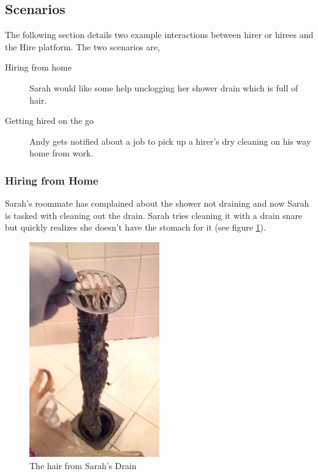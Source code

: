 \documentclass[11pt]{article}
\begin{document}
\subsection{Scenarios}

The following section details two example interactions between hirer or hirees and the Hire platform. The two scenarios are,

\begin{description}
    \item[Hiring from home] Sarah would like some help unclogging her shower drain which is full of hair.
    \item[Getting hired on the go] Andy gets notified about a job to pick up a hirer's dry cleaning on his way home from work.
\end{description}

\subsubsection{Hiring from Home}

Sarah's roommate has complained about the shower not draining and now Sarah is tasked with cleaning out the drain. Sarah tries cleaning it with a drain snare but quickly realizes she doesn't have the stomach for it (see figure \ref{fig:sarahs-drain}).

\begin{figure}[htb]
    \centering
    \includegraphics[width=0.5\textwidth]{Img/showerhair}
    \caption{The hair from Sarah's Drain}\label{fig:sarahs-drain}
\end{figure} 
\end{document}
